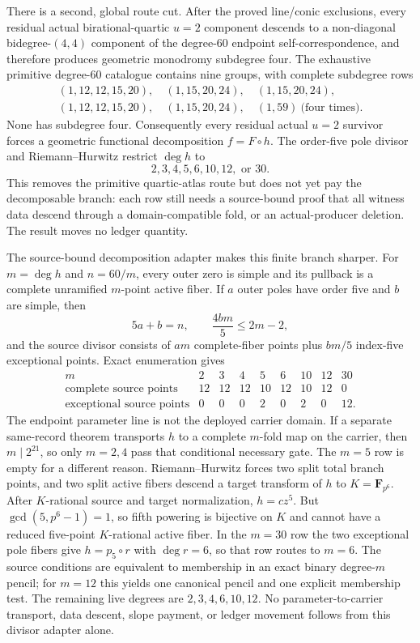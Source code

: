 \documentclass[11pt]{article}
\begin{document}
There is a second, global route cut.  After the proved line/conic
exclusions, every residual actual birational-quartic \(u=2\) component
descends to a non-diagonal bidegree-\((4,4)\) component of the degree-\(60\)
endpoint self-correspondence, and therefore produces geometric monodromy
subdegree four.  The exhaustive primitive degree-\(60\) catalogue contains
nine groups, with complete subdegree rows
\[
\begin{gathered}
  (1,12,12,15,20),\quad
  (1,15,20,24),\quad
  (1,15,20,24),\\
  (1,12,12,15,20),\quad
  (1,15,20,24),\quad
  (1,59)\ \text{(four times)}.
\end{gathered}
\]
None has subdegree four.  Consequently every residual actual \(u=2\)
survivor forces a geometric functional decomposition \(f=F\circ h\).  The
order-five pole divisor and Riemann--Hurwitz restrict \(\deg h\) to
\[
  2,3,4,5,6,10,12,\text{ or }30.
\]
This removes the primitive quartic-atlas route but does not yet pay the
decomposable branch: each row still needs a source-bound proof that all
witness data descend through a domain-compatible fold, or an
actual-producer deletion.  The result moves no ledger quantity.

The source-bound decomposition adapter makes this finite branch sharper.
For \(m=\deg h\) and \(n=60/m\), every outer zero is simple and its
pullback is a complete unramified \(m\)-point active fiber.  If \(a\) outer
poles have order five and \(b\) are simple, then
\[
  5a+b=n,\qquad
  \frac{4bm}{5}\le2m-2,
\]
and the source divisor consists of \(am\) complete-fiber points plus
\(bm/5\) index-five exceptional points.  Exact enumeration gives
\[
\begin{array}{c|rrrrrrrr}
m&2&3&4&5&6&10&12&30\\ \hline
\text{complete source points}&12&12&12&10&12&10&12&0\\
\text{exceptional source points}&0&0&0&2&0&2&0&12.
\end{array}
\]
The endpoint parameter line is not the deployed carrier domain.  If a
separate same-record theorem transports \(h\) to a complete \(m\)-fold map
on the carrier, then \(m\mid2^{21}\), so only \(m=2,4\) pass that
conditional necessary gate.  The \(m=5\) row is empty for a different
reason.  Riemann--Hurwitz forces two split total branch points, and two
split active fibers descend a target transform of \(h\) to
\(K=\mathbf F_{p^6}\).  After \(K\)-rational source and target
normalization, \(h=cz^5\).  But
\(\gcd(5,p^6-1)=1\), so fifth powering is bijective on \(K\) and cannot
have a reduced five-point \(K\)-rational active fiber.  In the \(m=30\)
row the two exceptional pole fibers give \(h=p_5\circ r\) with
\(\deg r=6\), so that row routes to \(m=6\).  The source conditions are
equivalent to membership in an exact binary degree-\(m\) pencil; for
\(m=12\) this yields one canonical pencil and one explicit membership
test.  The remaining live degrees are \(2,3,4,6,10,12\).  No
parameter-to-carrier transport, data descent, slope payment, or ledger
movement follows from this divisor adapter alone.
\end{document}
